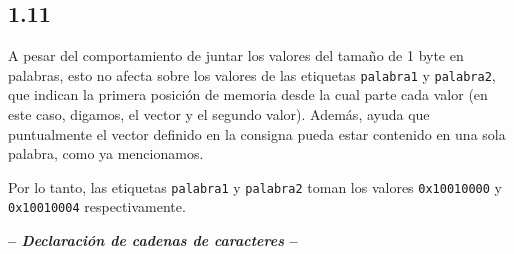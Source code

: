 \documentclass[a4paper]{report}
\begin{document}
\subsection*{1.11}

A pesar del comportamiento de juntar los valores del tamaño de 1 byte en palabras, esto no afecta sobre los valores de las etiquetas \texttt{palabra1} y \texttt{palabra2}, que indican la primera posición de memoria desde la cual parte cada valor (en este caso, digamos, el vector y el segundo valor). Además, ayuda que puntualmente el vector definido en la consigna pueda estar contenido en una sola palabra, como ya mencionamos.

Por lo tanto, las etiquetas \texttt{palabra1} y \texttt{palabra2} toman los valores \texttt{0x10010000} y \texttt{0x10010004} respectivamente.

\begin{center}
\large\textbf{-- \textsl{Declaración de cadenas de caracteres} --}
\end{center}
\end{document}

